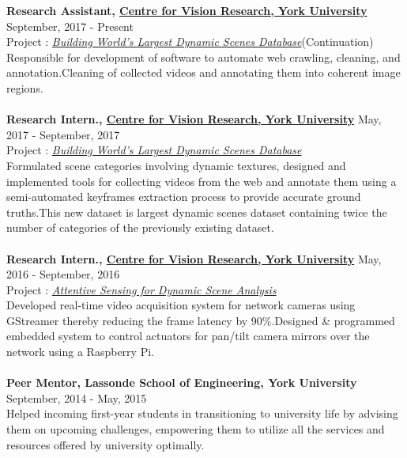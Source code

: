 \documentclass[margin, centered]{res}
\begin{document}
\begin{resume}
\textbf{Research Assistant,  \href{http://cvr.yorku.ca/} { Centre for Vision Research, York University}} 
\hfill September, 2017 - Present \\
Project : \href{http://www.lassondeundergraduateresearch.com/electricalandcomputer#/new-page-s6yt8/}{\emph{Building World's Largest Dynamic Scenes Database}}(Continuation)\\
Responsible for development of software to automate web crawling, cleaning, and annotation.Cleaning of collected videos and annotating them into coherent image regions.
\\\\
\textbf{Research Intern.,  \href{http://cvr.yorku.ca/} { Centre for Vision Research, York University}} 
\hfill May, 2017 - September, 2017 \\
Project : \href{http://www.lassondeundergraduateresearch.com/electricalandcomputer#/new-page-s6yt8/}{\emph{Building World's Largest Dynamic Scenes Database}}\\
Formulated scene categories involving dynamic textures, designed and implemented tools for collecting videos from the web and annotate them using a semi-automated keyframes extraction process to provide accurate ground truths.This new dataset is largest dynamic scenes dataset containing twice the number of categories of the previously existing dataset. 
\\ \\
\textbf{Research Intern.,  \href{http://cvr.yorku.ca/} { Centre for Vision Research, York University}} 
\hfill May, 2016 - September, 2016 \\
Project : \href{http://www.lassondeundergraduateresearch.com/lassonde#/amanpreet-walia/}{\emph{Attentive Sensing for Dynamic Scene Analysis}}\\ 
Developed real-time video acquisition system for network cameras using GStreamer thereby reducing the frame latency by 90\%.Designed \& programmed embedded system to control actuators for pan/tilt camera mirrors over the network using a Raspberry Pi.
\\\\
\textbf{Peer Mentor,  Lassonde School of Engineering, York University}  \hfill September, 2014 - May, 2015 \\
Helped incoming first-year students in transitioning to university life by advising them on upcoming challenges, empowering them to utilize all the services and resources offered by university optimally.

\end{resume}
\end{document}
